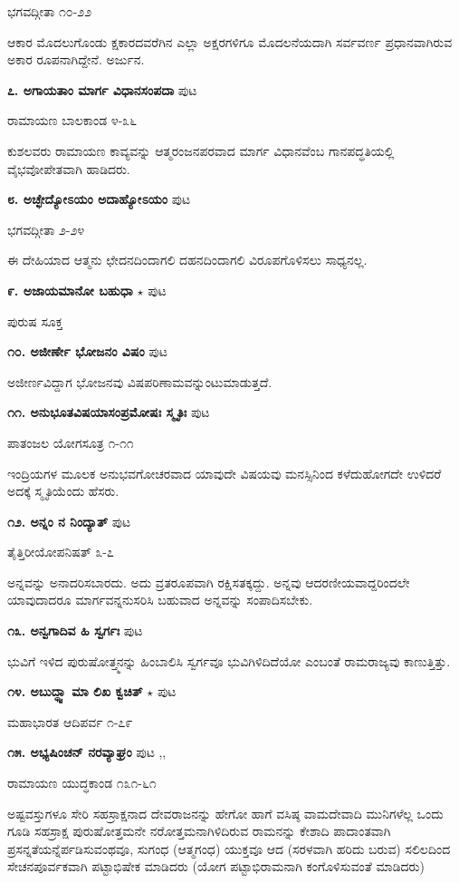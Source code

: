 \hfill ಭಗವದ್ಗೀತಾ ೧೦-೨೨

ಆಕಾರ ಮೊದಲುಗೊಂಡು ಕ್ಷಕಾರದವರೆಗಿನ ಎಲ್ಲಾ ಅಕ್ಷರಗಳಿಗೂ ಮೊದಲನೆಯದಾಗಿ ಸರ್ವವರ್ಣ ಪ್ರಧಾನವಾಗಿರುವ ಅಕಾರ ರೂಪನಾಗಿದ್ದೇನೆ. ಅರ್ಜುನ. 

\medskip
\noindent\textbf{೭. ಅಗಾಯತಾಂ ಮಾರ್ಗ ವಿಧಾನಸಂಪದಾ} \hfill ಪುಟ \pageref{188}

\hfill ರಾಮಾಯಣ ಬಾಲಕಾಂಡ ೪-೩೬

ಕುಶಲವರು ರಾಮಾಯಣ ಕಾವ್ಯವನ್ನು ಆತ್ಮರಂಜನಪರವಾದ ಮಾರ್ಗ ವಿಧಾನವೆಂಬ ಗಾನಪದ್ಧತಿಯಲ್ಲಿ ವೈಭವೋಪೇತವಾಗಿ ಹಾಡಿದರು.

\medskip
\noindent\textbf{೮. ಅಚ್ಛೇದ್ಯೋಽಯಂ ಅದಾಹ್ಯೋಽಯಂ } \hfill ಪುಟ \pageref{36}

\hfill ಭಗವದ್ಗೀತಾ ೨-೨೪

ಈ ದೇಹಿಯಾದ ಆತ್ಮನು ಛೇದನದಿಂದಾಗಲಿ ದಹನದಿಂದಾಗಲಿ ವಿರೂಪಗೊಳಿಸಲು ಸಾಧ್ಯನಲ್ಲ.

\medskip
\noindent\textbf{೯. ಅಜಾಯಮಾನೋ ಬಹುಧಾ} $\star$ \hfill ಪುಟ\pageref{150a}

\hfill ಪುರುಷ ಸೂಕ್ತ

\medskip
\noindent\textbf{೧೦. ಅಜೀರ್ಣೇ ಭೋಜನಂ ವಿಷಂ } \hfill ಪುಟ \pageref{265}

\hfill ಅಜೀರ್ಣವಿದ್ದಾಗ ಭೋಜನವು ವಿಷಪರಿಣಾಮವನ್ನುಂಟುಮಾಡುತ್ತದೆ.

\medskip
\noindent\textbf{೧೧. ಅನುಭೂತವಿಷಯಾಸಂಪ್ರಮೋಷಃ ಸ್ಮೃತಿಃ} \hfill ಪುಟ \pageref{81}

\hfill ಪಾತಂಜಲ ಯೋಗಸೂತ್ರ ೧-೧೧

ಇಂದ್ರಿಯಗಳ ಮೂಲಕ ಅನುಭವಗೋಚರವಾದ ಯಾವುದೇ ವಿಷಯವು ಮನಸ್ಸಿನಿಂದ ಕಳೆದುಹೋಗದೇ ಉಳಿದರೆ ಅದಕ್ಕೆ ಸ್ಮೃತಿಯೆಂದು ಹೆಸರು.

\medskip
\noindent\textbf{೧೨. ಅನ್ನಂ ನ ನಿಂದ್ಯಾತ್} \hfill ಪುಟ \pageref{76}

\hfill ತೈತ್ತಿರೀಯೋಪನಿಷತ್ ೩-೭

ಅನ್ನವನ್ನು ಅನಾದರಿಸಬಾರದು. ಅದು ವ್ರತರೂಪವಾಗಿ ರಕ್ಷಿಸತಕ್ಕದ್ದು. ಅನ್ನವು ಆದರಣೀಯವಾದ್ದರಿಂದಲೇ ಯಾವುದಾದರೂ ಮಾರ್ಗವನ್ನನುಸರಿಸಿ ಬಹುವಾದ ಅನ್ನವನ್ನು ಸಂಪಾದಿಸಬೇಕು.

\medskip
\noindent\textbf{೧೩. ಅನ್ವಗಾದಿವ ಹಿ ಸ್ವರ್ಗಃ} \hfill ಪುಟ \pageref{252}

ಭುವಿಗೆ ಇಳಿದ ಪುರುಷೋತ್ತ್ಮನನ್ನು ಹಿಂಬಾಲಿಸಿ ಸ್ವರ್ಗವೂ ಭುವಿಗಿಳಿದಿದೆಯೋ ಎಂಬಂತೆ ರಾಮರಾಜ್ಯವು ಕಾಣುತ್ತಿತ್ತು.

\medskip
\noindent\textbf{೧೪. ಅಬುದ್ಧ್ವಾ ಮಾ ಲಿಖ ಕ್ವಚಿತ್ } $\star$ \hfill ಪುಟ \pageref{119a}

\hfill ಮಹಾಭಾರತ ಆದಿಪರ್ವ ೧-೭೯

\medskip
\noindent\textbf{೧೫. ಅಭ್ಯಷಿಂಚನ್ ನರವ್ಯಾಘ್ರಂ} \hfill ಪುಟ \pageref{150},\pageref{208},\pageref{248a}

\hfill ರಾಮಾಯಣ ಯುದ್ಧಕಾಂಡ ೧೩೧-೬೧

ಅಷ್ಟವಸ್ತುಗಳೂ ಸೇರಿ ಸಹಸ್ರಾಕ್ಷನಾದ ದೇವರಾಜನನ್ನು ಹೇಗೋ ಹಾಗೆ ವಸಿಷ್ಠ ವಾಮದೇವಾದಿ ಮುನಿಗಳೆಲ್ಲ ಒಂದು ಗೂಡಿ ಸಹಸ್ರಾಕ್ಷ ಪುರುಷೋತ್ತಮನೇ ನರೋತ್ತಮನಾಗಿಳಿದಿರುವ ರಾಮನನ್ನು ಕೇಶಾದಿ ಪಾದಾಂತವಾಗಿ ಪ್ರಸನ್ನತೆಯನ್ನೆರ್ಪಡಿಸುವಂಥವೂ, ಸುಗಂಧ (ಆತ್ಮಗಂಧ) ಯುಕ್ತವೂ ಆದ (ಸರಳವಾಗಿ ಹರಿದು ಬರುವ) ಸಲಿಲದಿಂದ ಸೇಚನಪೂರ್ವಕವಾಗಿ ಪಟ್ಟಾಭಿಷೇಕ ಮಾಡಿದರು (ಯೋಗ ಪಟ್ಟಾಭಿರಾಮನಾಗಿ ಕಂಗೊಳಿಸುವಂತೆ ಮಾಡಿದರು)

